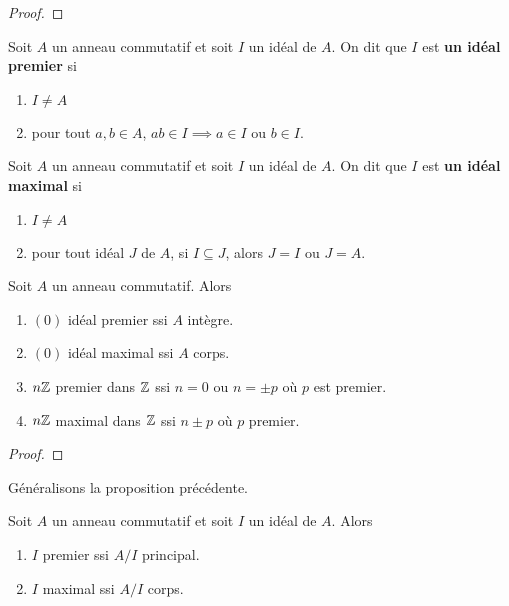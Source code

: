 \ifdefined\outputproof
\begin{proof}

\end{proof}
\fi

\begin{definition} 
	Soit $A$ un anneau commutatif et soit $I$ un idéal de $A$.
	On dit que $I$ est \textbf{un idéal premier} si
	\begin{enumerate}
		\item $I \neq A$
		\item pour tout $a, b \in A$, $ab \in I \implies a \in I \text{ ou } b
			\in I$.
	\end{enumerate}
\end{definition}

\begin{definition} 
	Soit $A$ un anneau commutatif et soit $I$ un idéal de $A$.
	On dit que $I$ est \textbf{un idéal maximal} si
	\begin{enumerate}
		\item $I \neq A$
		\item pour tout idéal $J$ de $A$, si $I \subseteq J$, alors $J = I$ ou
			$J = A$.
	\end{enumerate}
\end{definition}

\begin{proposition}
	Soit $A$ un anneau commutatif. Alors
	\begin{enumerate}
		\item $(0)$ idéal premier ssi $A$ intègre.
		\item $(0)$ idéal maximal ssi $A$ corps.
		\item $n \mathbb{Z}$ premier dans $\mathbb{Z}$ ssi $n = 0$ ou $n = \pm p$ où
			$p$ est premier.
		\item $n \mathbb{Z}$ maximal dans $\mathbb{Z}$ ssi $n \pm p$ où $p$ premier.
	\end{enumerate}
\end{proposition}

\ifdefined\outputproof
\begin{proof}

\end{proof}
\fi

Généralisons la proposition précédente.

\begin{proposition}
	Soit $A$ un anneau commutatif et soit $I$ un idéal de $A$.
	Alors
	\begin{enumerate}
		\item $I$ premier ssi $A / I$ principal.
		\item $I$ maximal ssi $A / I$ corps.
	\end{enumerate}
\end{proposition}

